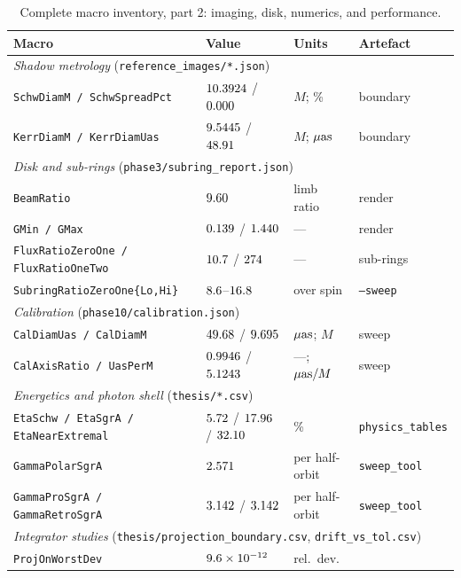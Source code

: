 \begin{table}[p]
\centering
\caption{Complete macro inventory, part 2: imaging, disk, numerics,
and performance.}
\label{tab:macros2}
\footnotesize
\setlength{\tabcolsep}{4pt}
\begin{tabular}{llll}
\toprule
Macro & Value & Units & Artefact \\
\midrule
\multicolumn{4}{l}{\emph{Shadow metrology}
(\texttt{reference\_images/*.json})}\\
\texttt{SchwDiamM / SchwSpreadPct} &
  $10.3924$ / $0.000$ & $M$; \% & boundary \\
\texttt{KerrDiamM / KerrDiamUas} &
  $9.5445$ / $48.91$ & $M$; $\mu\mathrm{as}$ & boundary \\
\midrule
\multicolumn{4}{l}{\emph{Disk and sub-rings}
(\texttt{phase3/subring\_report.json})}\\
\texttt{BeamRatio} & $9.60$ & limb ratio & render \\
\texttt{GMin / GMax} & $0.139$ / $1.440$ & --- & render \\
\texttt{FluxRatioZeroOne / FluxRatioOneTwo} &
  $10.7$ / $274$ & --- & sub-rings \\
\texttt{SubringRatioZeroOne\{Lo,Hi\}} &
  $8.6$--$16.8$ & over spin &
  \texttt{--sweep} \\
\midrule
\multicolumn{4}{l}{\emph{Calibration}
(\texttt{phase10/calibration.json})}\\
\texttt{CalDiamUas / CalDiamM} & $49.68$ / $9.695$ &
  $\mu\mathrm{as}$; $M$ & sweep \\
\texttt{CalAxisRatio / UasPerM} & $0.9946$ / $5.1243$ &
  ---; $\mu\mathrm{as}/M$ & sweep \\
\midrule
\multicolumn{4}{l}{\emph{Energetics and photon shell}
(\texttt{thesis/*.csv})}\\
\texttt{EtaSchw / EtaSgrA / EtaNearExtremal} &
  $5.72$ / $17.96$ / $32.10$ & \% &
  \texttt{physics\_tables} \\
\texttt{GammaPolarSgrA} & $2.571$ & per half-orbit &
  \texttt{sweep\_tool} \\
\texttt{GammaProSgrA / GammaRetroSgrA} &
  $3.142$ / $3.142$ & per half-orbit &
  \texttt{sweep\_tool} \\
\midrule
\multicolumn{4}{l}{\emph{Integrator studies}
(\texttt{thesis/projection\_boundary.csv},
\texttt{drift\_vs\_tol.csv})}\\
\texttt{ProjOnWorstDev} & $9.6\times10^{-12}$ & rel.\ dev. &

\end{tabular}
\end{table}
